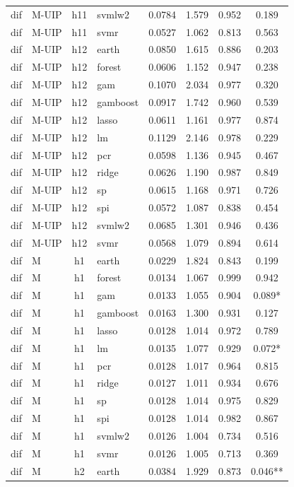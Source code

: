 \begin{ThreePartTable}
\begin{longtable}[t]{llclcccc}
dif & M-UIP & h11 & svmlw2 & 0.0784 & 1.579 & 0.952 & 0.189\\
dif & M-UIP & h11 & svmr & 0.0527 & 1.062 & 0.813 & 0.563\\
\addlinespace
dif & M-UIP & h12 & earth & 0.0850 & 1.615 & 0.886 & 0.203\\
dif & M-UIP & h12 & forest & 0.0606 & 1.152 & 0.947 & 0.238\\
dif & M-UIP & h12 & gam & 0.1070 & 2.034 & 0.977 & 0.320\\
dif & M-UIP & h12 & gamboost & 0.0917 & 1.742 & 0.960 & 0.539\\
dif & M-UIP & h12 & lasso & 0.0611 & 1.161 & 0.977 & 0.874\\
dif & M-UIP & h12 & lm & 0.1129 & 2.146 & 0.978 & 0.229\\
dif & M-UIP & h12 & pcr & 0.0598 & 1.136 & 0.945 & 0.467\\
dif & M-UIP & h12 & ridge & 0.0626 & 1.190 & 0.987 & 0.849\\
dif & M-UIP & h12 & sp & 0.0615 & 1.168 & 0.971 & 0.726\\
dif & M-UIP & h12 & spi & 0.0572 & 1.087 & 0.838 & 0.454\\
dif & M-UIP & h12 & svmlw2 & 0.0685 & 1.301 & 0.946 & 0.436\\
dif & M-UIP & h12 & svmr & 0.0568 & 1.079 & 0.894 & 0.614\\
\addlinespace
dif & M & h1 & earth & 0.0229 & 1.824 & 0.843 & 0.199\\
dif & M & h1 & forest & 0.0134 & 1.067 & 0.999 & 0.942\\
dif & M & h1 & gam & 0.0133 & 1.055 & 0.904 & 0.089*\\
dif & M & h1 & gamboost & 0.0163 & 1.300 & 0.931 & 0.127\\
dif & M & h1 & lasso & 0.0128 & 1.014 & 0.972 & 0.789\\
dif & M & h1 & lm & 0.0135 & 1.077 & 0.929 & 0.072*\\
dif & M & h1 & pcr & 0.0128 & 1.017 & 0.964 & 0.815\\
dif & M & h1 & ridge & 0.0127 & 1.011 & 0.934 & 0.676\\
dif & M & h1 & sp & 0.0128 & 1.014 & 0.975 & 0.829\\
dif & M & h1 & spi & 0.0128 & 1.014 & 0.982 & 0.867\\
dif & M & h1 & svmlw2 & 0.0126 & 1.004 & 0.734 & 0.516\\
dif & M & h1 & svmr & 0.0126 & 1.005 & 0.713 & 0.369\\
\addlinespace
dif & M & h2 & earth & 0.0384 & 1.929 & 0.873 & 0.046**\\

\end{longtable}
\end{ThreePartTable}

